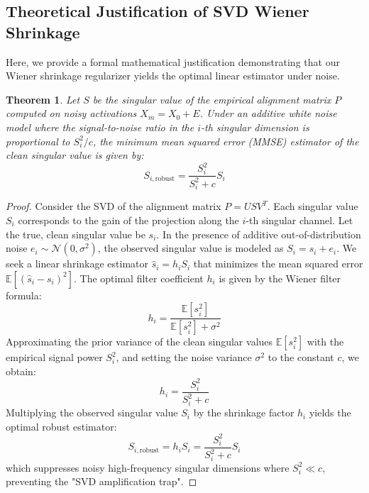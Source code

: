\documentclass{article}
\theoremstyle{plain}
\newtheorem{theorem}{Theorem}[section]
\theoremstyle{definition}
\theoremstyle{remark}
\begin{document}
\subsection{Theoretical Justification of SVD Wiener Shrinkage}
Here, we provide a formal mathematical justification demonstrating that our Wiener shrinkage regularizer yields the optimal linear estimator under noise.

\begin{theorem}
Let $S$ be the singular value of the empirical alignment matrix $P$ computed on noisy activations $X_m = X_0 + E$. Under an additive white noise model where the signal-to-noise ratio in the $i$-th singular dimension is proportional to $S_i^2 / c$, the minimum mean squared error (MMSE) estimator of the clean singular value is given by:
\begin{equation}
    S_{i, \text{robust}} = \frac{S_i^2}{S_i^2 + c} S_i
\end{equation}
\end{theorem}
\begin{proof}
Consider the SVD of the alignment matrix $P = U S V^T$. Each singular value $S_i$ corresponds to the gain of the projection along the $i$-th singular channel. Let the true, clean singular value be $s_i$. In the presence of additive out-of-distribution noise $e_i \sim \mathcal{N}(0, \sigma^2)$, the observed singular value is modeled as $S_i = s_i + e_i$. We seek a linear shrinkage estimator $\hat{s}_i = h_i S_i$ that minimizes the mean squared error $\mathbb{E}[(\hat{s}_i - s_i)^2]$.
The optimal filter coefficient $h_i$ is given by the Wiener filter formula:
\begin{equation}
    h_i = \frac{\mathbb{E}[s_i^2]}{\mathbb{E}[s_i^2] + \sigma^2}
\end{equation}
Approximating the prior variance of the clean singular values $\mathbb{E}[s_i^2]$ with the empirical signal power $S_i^2$, and setting the noise variance $\sigma^2$ to the constant $c$, we obtain:
\begin{equation}
    h_i = \frac{S_i^2}{S_i^2 + c}
\end{equation}
Multiplying the observed singular value $S_i$ by the shrinkage factor $h_i$ yields the optimal robust estimator:
\begin{equation}
    S_{i, \text{robust}} = h_i S_i = \frac{S_i^2}{S_i^2 + c} S_i
\end{equation}
which suppresses noisy high-frequency singular dimensions where $S_i^2 \ll c$, preventing the "SVD amplification trap".
\end{proof}
\end{document}
